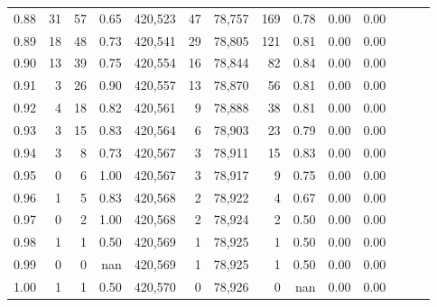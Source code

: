 \begin{tabular}{rrrrrrrrrrrrrr}
0.88 &      31 &     57 &  0.65 &  420,523 &       47 &  78,757 &     169 &  0.78 &  0.00 &      0.00 \\
0.89 &      18 &     48 &  0.73 &  420,541 &       29 &  78,805 &     121 &  0.81 &  0.00 &      0.00 \\
0.90 &      13 &     39 &  0.75 &  420,554 &       16 &  78,844 &      82 &  0.84 &  0.00 &      0.00 \\
0.91 &       3 &     26 &  0.90 &  420,557 &       13 &  78,870 &      56 &  0.81 &  0.00 &      0.00 \\
0.92 &       4 &     18 &  0.82 &  420,561 &        9 &  78,888 &      38 &  0.81 &  0.00 &      0.00 \\
0.93 &       3 &     15 &  0.83 &  420,564 &        6 &  78,903 &      23 &  0.79 &  0.00 &      0.00 \\
0.94 &       3 &      8 &  0.73 &  420,567 &        3 &  78,911 &      15 &  0.83 &  0.00 &      0.00 \\
0.95 &       0 &      6 &  1.00 &  420,567 &        3 &  78,917 &       9 &  0.75 &  0.00 &      0.00 \\
0.96 &       1 &      5 &  0.83 &  420,568 &        2 &  78,922 &       4 &  0.67 &  0.00 &      0.00 \\
0.97 &       0 &      2 &  1.00 &  420,568 &        2 &  78,924 &       2 &  0.50 &  0.00 &      0.00 \\
0.98 &       1 &      1 &  0.50 &  420,569 &        1 &  78,925 &       1 &  0.50 &  0.00 &      0.00 \\
0.99 &       0 &      0 &   nan &  420,569 &        1 &  78,925 &       1 &  0.50 &  0.00 &      0.00 \\
1.00 &       1 &      1 &  0.50 &  420,570 &        0 &  78,926 &       0 &   nan &  0.00 &      0.00 \\
\bottomrule
\end{tabular}
